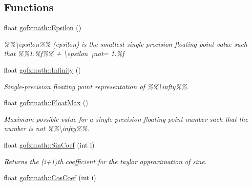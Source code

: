 \subsection*{Functions}
\begin{DoxyCompactItemize}
\item 
\hypertarget{group___scalar_math_consts_ga88a517d09326cefa42e5a854384217dd}{}float \hyperlink{group___scalar_math_consts_ga88a517d09326cefa42e5a854384217dd}{gofxmath\+::\+Epsilon} ()\label{group___scalar_math_consts_ga88a517d09326cefa42e5a854384217dd}

\begin{DoxyCompactList}\small\item\em \%\%\textbackslash{}epsilon\%\% (epsilon) is the smallest single-\/precision floating point value such that \%\%1.\%f\%\% + \textbackslash{}epsilon \textbackslash{}not= 1.\%f \end{DoxyCompactList}\item 
\hypertarget{group___scalar_math_consts_ga06bd81da4df7e94c91fbd777f208f000}{}float \hyperlink{group___scalar_math_consts_ga06bd81da4df7e94c91fbd777f208f000}{gofxmath\+::\+Infinity} ()\label{group___scalar_math_consts_ga06bd81da4df7e94c91fbd777f208f000}

\begin{DoxyCompactList}\small\item\em Single-\/precision floating point representation of \%\%\textbackslash{}infty\%\%. \end{DoxyCompactList}\item 
\hypertarget{group___scalar_math_consts_ga6a01ee138954aa627264187944f9b636}{}float \hyperlink{group___scalar_math_consts_ga6a01ee138954aa627264187944f9b636}{gofxmath\+::\+Float\+Max} ()\label{group___scalar_math_consts_ga6a01ee138954aa627264187944f9b636}

\begin{DoxyCompactList}\small\item\em Maximum possible value for a single-\/precision floating point number such that the number is not \%\%\textbackslash{}infty\%\%. \end{DoxyCompactList}\item 
\hypertarget{group___scalar_math_consts_gaee3e576be53b2e48bc14cb4779197d48}{}float \hyperlink{group___scalar_math_consts_gaee3e576be53b2e48bc14cb4779197d48}{gofxmath\+::\+Sin\+Coef} (int i)\label{group___scalar_math_consts_gaee3e576be53b2e48bc14cb4779197d48}

\begin{DoxyCompactList}\small\item\em Returns the (i+1)th coefficient for the taylor approximation of sine. \end{DoxyCompactList}\item 
\hypertarget{group___scalar_math_consts_ga6ed06be895b61252517cb57df1f83ffa}{}float \hyperlink{group___scalar_math_consts_ga6ed06be895b61252517cb57df1f83ffa}{gofxmath\+::\+Cos\+Coef} (int i)\label{group___scalar_math_consts_ga6ed06be895b61252517cb57df1f83ffa}


\end{DoxyCompactItemize}
